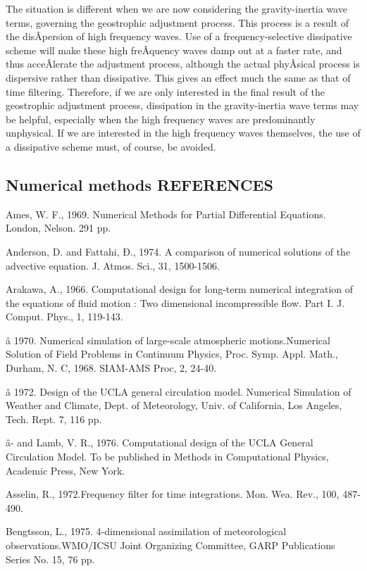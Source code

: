 The situation is different when we are now considering the
gravity-inertia wave terms, governing the geostrophic adjustment
process. This process is a result of the disÂ­persion of high frequency
waves. Use of a frequency-selective dissipative scheme will make these
high freÂ­quency waves damp out at a faster rate, and thus acceÂ­lerate
the adjustment process, although the actual phyÂ­sical process is
dispersive rather than dissipative. This gives an effect much the same
as that of time filtering. Therefore, if we are only interested in the
final result of the geostrophic adjustment process, dissipation in the
gravity-inertia wave terms may be helpful, especially when the high
frequency waves are predominantly unphysical. If we are interested in
the high frequency waves themselves, the use of a dissipative scheme
must, of course, be avoided.

\subsection{Numerical methods REFERENCES}



Ames, W. F., 1969. Numerical Methods for Partial Differential Equations.
London, Nelson. 291 pp.

Anderson, D. and Fattahi, Ð., 1974. A comparison of numerical solutions
of the advective equation. J. Atmos. Sci., 31, 1500-1506.

Arakawa, A., 1966. Computational design for long-term numerical
integration of the equations of fluid motion : Two dimensional
incompressible flow. Part I. J. Comput. Phys., 1, 119-143.

â 1970. Numerical simulation of large-scale atmospheric
motions.Numerical Solution of Field Problems in Continuum Physics, Proc.
Symp. Appl. Math., Durham, N. C, 1968. SIAM-AMS Proc, 2, 24-40.

â 1972. Design of the UCLA general circulation model. Numerical
Simulation of Weather and Climate, Dept. of Meteorology, Univ. of
California, Los Angeles, Tech. Rept. 7, 116 pp.

â- and Lamb, V. R., 1976. Computational design of the UCLA General
Circulation Model. To be published in Methods in Computational Physics,
Academic Press, New York.

Asselin, R., 1972.Frequency filter for time integrations. Mon. Wea.
Rev., 100, 487-490.

Bengtsson, L., 1975. 4-dimensional assimilation of meteorological
observations.WMO/ICSU Joint Organizing Committee, GARP Publications
Series No. 15, 76 pp.

